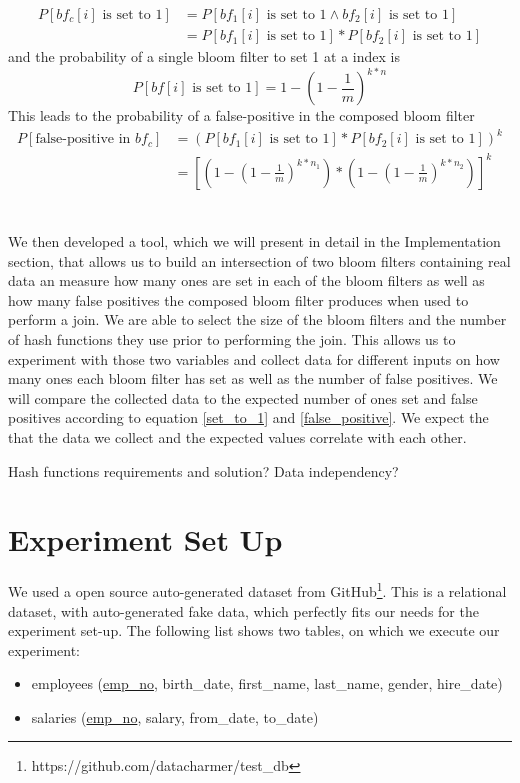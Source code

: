 \documentclass[12]{scrartcl}
\begin{document}
\begin{equation}
\begin{split}
	P[bf_c[i] \text{ is set to 1}] &= P[bf_1[i] \text{ is set to 1} \wedge bf_2[i] \text{ is set to 1}]\\
	&= P[bf_1[i] \text{ is set to 1}] * P[bf_2[i] \text{ is set to 1}]
\end{split}
\end{equation}
and the probability of a single bloom filter to set 1 at a index is
\begin{equation}
\label{set_to_1}
P[bf[i] \text{ is set to 1}] = 1-(1-\frac{1}{m})^{k*n}
\end{equation}
This leads to the probability of a false-positive in the composed bloom filter
\begin{equation}
\label{false_positive}
\begin{split}
P[\text{false-positive in }bf_c] &= (P[bf_1[i] \text{ is set to 1}] * P[bf_2[i] \text{ is set to 1}])^k\\
&= [(1-(1-\frac{1}{m})^{k*n_1}) * (1-(1-\frac{1}{m})^{k*n_2})]^k
\end{split}
\end{equation}\\\\
We then developed a tool, which we will present in detail in the Implementation section, that allows us to build an intersection of two bloom filters containing real data an measure how many ones are set in each of the bloom filters as well as how many false positives the composed bloom filter produces when used to perform a join. We are able to select the size of the bloom filters and the number of hash functions they use prior to performing the join. This allows us to experiment with those two variables and collect data for different inputs on how many ones each bloom filter has set as well as the number of false positives. We will compare the collected data to the expected number of ones set and false positives according to equation \ref{set_to_1} and \ref{false_positive}. We expect the that the data we collect and the expected values correlate with each other.
 
 Hash functions requirements and solution?
 Data independency?

\section{Experiment Set Up}
We used a open source auto-generated dataset from GitHub\footnote{https://github.com/datacharmer/test\_db}. This is a relational dataset, with auto-generated fake data, which perfectly fits our needs for the experiment set-up. The following list shows two tables, on which we execute our experiment: 
\begin{itemize}
	\item employees (\uline{emp\_no}, birth\_date, first\_name, last\_name, gender, hire\_date)
	\item salaries (\uline{emp\_no}, salary, from\_date, to\_date)
\end{itemize}
\vspace{1cm}
\end{document}
